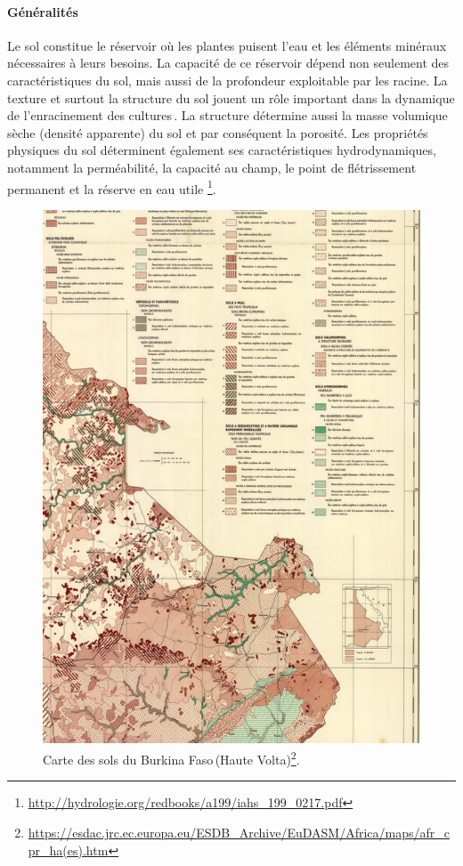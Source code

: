 \documentclass[a4paper,11pt]{article}
\begin{document}
\paragraph{Généralités}

Le sol constitue le réservoir où les plantes puisent l’eau et les
éléments minéraux nécessaires à leurs besoins. La capacité de ce
réservoir dépend non seulement des caractéristiques du sol, mais aussi
de la profondeur exploitable par les racine. La texture et surtout la
structure du sol jouent un rôle important dans la dynamique de
l’enracinement des cultures\,\cite{Chopart_1980}. La structure détermine
aussi la masse volumique sèche (densité apparente) du sol et par
conséquent la porosité. Les propriétés physiques du sol déterminent
également ses caractéristiques hydrodynamiques, notamment la
perméabilité, la capacité au champ, le point de flétrissement
permanent et la réserve en eau utile
\footnote{\url{http://hydrologie.org/redbooks/a199/iahs_199_0217.pdf}}.


\begin{figure}%
 \begin{center}
   \includegraphics[width=12cm]{images/cartepedobf}
  \end{center}
  \caption{Carte des sols du Burkina Faso\,(Haute Volta)\protect\footnote{\protect\url{https://esdac.jrc.ec.europa.eu/ESDB_Archive/EuDASM/Africa/maps/afr_cpr_ha(es).htm}}.}
\end{figure}
\end{document}
